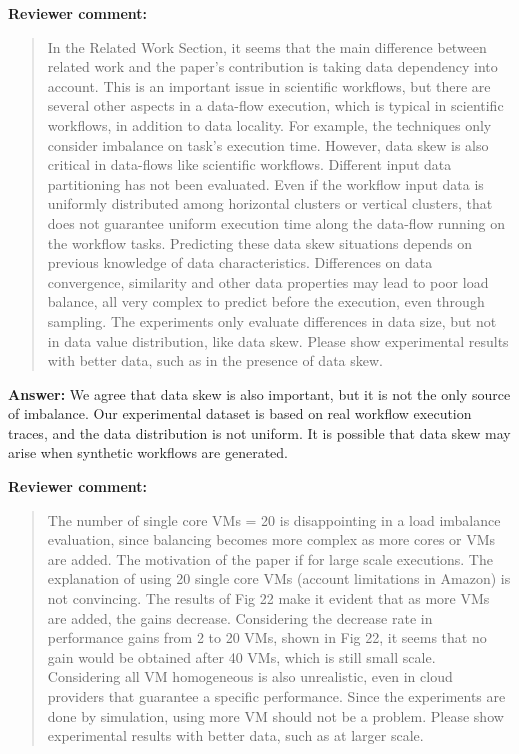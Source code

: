 \documentclass{letter}
\newenvironment{review}%
{\textbf{Reviewer comment:}\begin{quote}}%
{\end{quote}}%
\newcommand{\answer}[1]{%
      \textbf{Answer:} #1}
\begin{document}
\begin{letter}{}
\begin{review}
In the Related Work Section, it seems that the main difference between related work and the paper's contribution is taking data dependency into account. This is an important issue in scientific workflows, but there are several other aspects in a data-flow execution, which is typical in scientific workflows, in addition to data locality. For example, the techniques only consider imbalance on task's execution time. However, data skew is also critical in data-flows like scientific workflows. Different input data partitioning has not been evaluated. Even if the workflow input data is uniformly distributed among horizontal clusters or vertical clusters, that does not guarantee uniform execution time along the data-flow running on the workflow tasks. Predicting these data skew situations depends on previous knowledge of data characteristics. Differences on data convergence, similarity and other data properties may lead to poor load balance, all very complex to predict before the execution, even through sampling. The experiments only evaluate differences in data size, but not in data value distribution, like data skew. Please show experimental results with better data, such as in the presence of data skew.
\end{review}

\answer{We agree that data skew is also important, but it is not the only source of imbalance. Our experimental dataset is based on real workflow execution traces, and the data distribution is not uniform. It is possible that data skew may arise when synthetic workflows are generated.}


\begin{review}
The number of single core VMs = 20 is disappointing in a load imbalance evaluation, since balancing becomes more complex as more cores or VMs are added. The motivation of the paper if for large scale executions. The explanation of using 20 single core VMs (account limitations in Amazon) is not convincing. The results of Fig 22 make it evident that as more VMs are added, the gains decrease. Considering the decrease rate in performance gains from 2 to 20 VMs, shown in Fig 22, it seems that no gain would be obtained after 40 VMs, which is still small scale. Considering all VM homogeneous is also unrealistic, even in cloud providers that guarantee a specific performance. Since the experiments are done by simulation, using more VM should not be a problem. Please show experimental results with better data, such as at larger scale. 
\end{review}


\end{letter}
\end{document}
